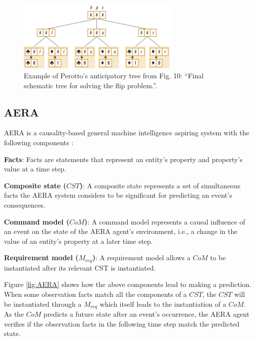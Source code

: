 \documentclass[runningheads]{llncs}
\begin{document}
\begin{figure}
	\centering
	\includegraphics[width=0.7\textwidth]{Figure_perotto_tree.png}
	\caption{Example of Perotto's anticipatory tree from \cite{perotto_computational_nodate} Fig. 10: ``Final schematic tree for solving the flip problem.''.
 } 
	\label{fig:perotto_tree}
\end{figure}



\subsection{AERA}

AERA is a causality-based general machine intelligence aspiring system with the following components \cite{sheikhlar2024causal,nivel2013replicode}: 

\noindent \textbf{Facts}: Facts are statements that represent an entity’s property and property’s value at a time step.

\noindent \textbf{Composite state ($CST$)}: A composite state represents a set of simultaneous facts the AERA system considers to be significant for predicting an event’s consequences.

\noindent \textbf{Command model ($CoM$)}: A command model represents a causal influence of an event on the state of the AERA agent’s environment, i.e., a change in the value of an entity’s property at a later time step.

\noindent \textbf{Requirement model ($M_{req}$)}: A requirement model allows a $CoM$ to be instantiated after its relevant CST is instantiated.

Figure \ref{fig:AERA} shows how the above components lead to making a prediction. When some observation facts match all the components of a $CST$, the $CST$ will be instantiated through a $M_{req}$ which itself leads to the instantiation of a $CoM$. As the $CoM$ predicts a future state after an event’s occurrence, the AERA agent verifies if the observation facts in the following time step match the predicted state.
\end{document}
